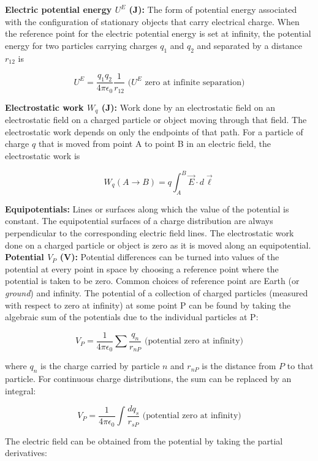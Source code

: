         \textbf{Electric potential energy $U^E$ (J):} The form of potential energy associated with the configuration of stationary objects that carry electrical charge. When the reference point for the electric potential
        energy is set at infinity, the potential energy for two particles carrying charges $q_1$ and $q_2$ and separated by a distance $r_{12}$ is

        \[
            U^E = \frac{q_1 q_2}{4\pi\epsilon_0} \frac{1}{r_{12}} \text{ ($U^E$ zero at infinite separation)}
        \]

        \textbf{Electrostatic work $W_q$ (J):} Work done by an electrostatic field on an electrostatic field on a charged particle or object moving through that field. The electrostatic work depends on only the endpoints
        of that path. For a particle of charge $q$ that is moved from point A to point B in an electric field, the electrostatic work is

        \[
            W_q (A\to B) = q\int_A^B \vec{E}\cdot d\vec{\ell}
        \]

        \textbf{Equipotentials:} Lines or surfaces along which the value of the potential is constant. The equipotential surfaces of a charge distribution are always perpendicular to the corresponding electric field
        lines. The electrostatic work done on a charged particle or object is zero as it is moved along an equipotential. \\
        \textbf{Potential $V_P$ (V):} Potential differences can be turned into values of the potential at every point in space by choosing a reference point where the potential is taken to be zero. Common choices of
        reference point are Earth (or \textit{ground}) and infinity. The potential of a collection of charged particles (measured with respect to zero at infinity) at some point P can be found by taking the algebraic sum
        of the potentials due to the individual particles at P:

        \[
            V_P = \frac{1}{4\pi\epsilon_0} \sum \frac{q_n}{r_{nP}} \text{ (potential zero at infinity)}
        \]

        where $q_n$ is the charge carried by particle $n$ and $r_{nP}$ is the distance from $P$ to that particle. For continuous charge distributions, the sum can be replaced by an integral:

        \[
            V_P = \frac{1}{4\pi\epsilon_0} \int \frac{dq_s}{r_{sP}} \text{ (potential zero at infinity)}
        \]

        The electric field can be obtained from the potential by taking the partial derivatives:


